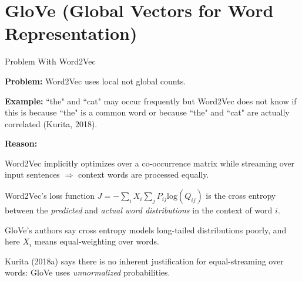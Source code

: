 


\section{GloVe (Global Vectors for Word Representation)}


\begin{frame}{Problem With Word2Vec}
    
    \begin{itemizeSpaced}{0pt}
        \item \textbf{Problem: } Word2Vec uses local not global counts.  
        \begin{itemizeSpaced}{0pt}
            \item \textbf{Example: }``the" and ``cat" may occur frequently but Word2Vec does not know if this is because ``the" is a common word or because ``the" and ``cat" are actually correlated  (Kurita, 2018). 
            
        \end{itemizeSpaced}
        
        \item \textbf{Reason: } 
        \begin{itemizeSpaced}{0pt}
            \item Word2Vec implicitly optimizes over a co-occurrence matrix while streaming over input sentences $\Rightarrow$ context words are processed equally.
            
            \item Word2Vec's loss function $J = - \sum_i X_i \sum_j P_{ij} \text{log}(Q_{ij}) $ is the cross entropy between the \emph{predicted} and \emph{actual word distributions} in the context of word $i$.  \footnotemark 
            
            \item GloVe's authors say cross entropy models long-tailed distributions poorly, and here $X_i$ means equal-weighting over words. 
            
            \item Kurita (2018a) says there is no inherent justification for equal-streaming over words: GloVe uses \emph{unnormalized} probabilities. 
            
        \end{itemizeSpaced}
        
    \end{itemizeSpaced}
    
\end{frame}




